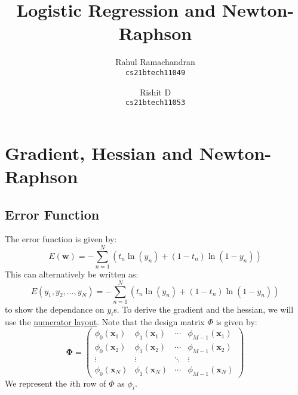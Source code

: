 \documentclass[a4paper, 11pt]{article}
\title{Logistic Regression and Newton-Raphson}
\author{
  Rahul Ramachandran\\
  \texttt{cs21btech11049}
  \and
  Rishit D\\
  \texttt{cs21btech11053}
}
\begin{document}
\maketitle
\tableofcontents
\section{Gradient, Hessian and Newton-Raphson}
\subsection{Error Function}
The error function is given by:
$$E(\textbf{w}) = -\sum_{n=1}^N\left(t_n\ln(y_n) + (1-t_n)\ln(1-y_n)\right)$$
This can alternatively be written as:
$$E(y_1, y_2, \ldots, y_N) = -\sum_{n=1}^N\left(t_n\ln(y_n) + (1-t_n)\ln(1-y_n)\right)$$
to show the dependance on $y_i$s.
To derive the gradient and the hessian, we will use the \href{https://en.wikipedia.org/wiki/Matrix_calculus#Layout_conventions}{numerator layout}.
Note that the design matrix $\Phi$ is given by:
$$\mathbf{\Phi}=\left(\begin{array}{cccc}
    \phi_0\left(\mathbf{x}_1\right) & \phi_1\left(\mathbf{x}_1\right) & \cdots & \phi_{M-1}\left(\mathbf{x}_1\right) \\
    \phi_0\left(\mathbf{x}_2\right) & \phi_1\left(\mathbf{x}_2\right) & \cdots & \phi_{M-1}\left(\mathbf{x}_2\right) \\
    \vdots & \vdots & \ddots & \vdots \\
    \phi_0\left(\mathbf{x}_N\right) & \phi_1\left(\mathbf{x}_N\right) & \cdots & \phi_{M-1}\left(\mathbf{x}_N\right)
    \end{array}\right)
$$
We represent the $i$th row of $\Phi$ as $\phi_i$.
\end{document}
